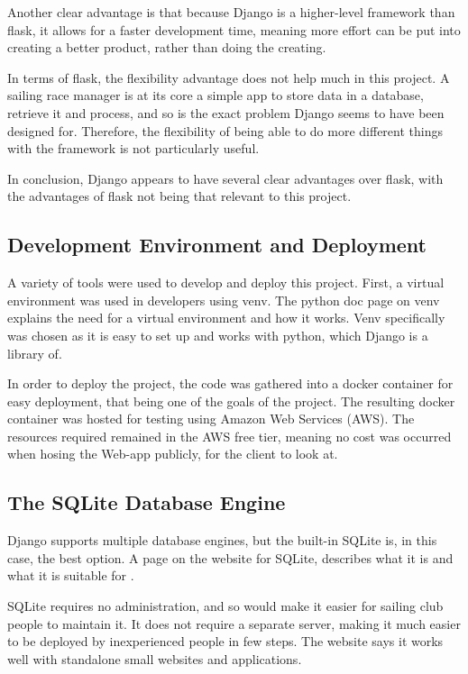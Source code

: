\documentclass{l4proj}
\begin{document}
Another clear advantage is that because Django is a higher-level framework than flask, it allows for a faster development time, meaning more effort can be put into creating a better product, rather than doing the creating.

In terms of flask, the flexibility advantage does not help much in this project. A sailing race manager is at its core a simple app to store data in a database, retrieve it and process, and so is the exact problem Django seems to have been designed for. Therefore, the flexibility of being able to do more different things with the framework is not particularly useful.

In conclusion, Django appears to have several clear advantages over flask, with the advantages of flask not being that relevant to this project. 

\subsection{Development Environment and Deployment}

A variety of tools were used to develop and deploy this project. First, a virtual environment was used in developers using venv. The python doc page on venv \citep{venv} explains the need for a virtual environment and how it works. Venv specifically was chosen as it is easy to set up and works with python, which Django is a library of.

In order to deploy the project, the code was gathered into a docker container for easy deployment, that being one of the goals of the project. The resulting docker container was hosted for testing using Amazon Web Services (AWS). The resources required remained in the AWS free tier, meaning no cost was occurred when hosing the Web-app publicly, for the client to look at.

\subsection{The SQLite Database Engine}
Django supports multiple database engines, but the built-in SQLite is, in this case, the best option. A page on the website for SQLite, describes what it is and what it is suitable for \citep{SQL}.

SQLite requires no administration, and so would make it easier for sailing club people to maintain it. It does not require a separate server, making it much easier to be deployed by inexperienced people in few steps. The website says it works well with standalone small websites and applications.
\end{document}
